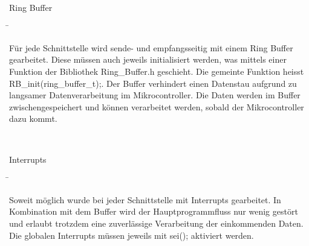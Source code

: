 \begin{tabbing}
{}\\

\parbox[t]{.3\textwidth}{

Ring Buffer

} \=\parbox[t]{.7\textwidth}{


Für jede Schnittstelle wird sende- und empfangsseitig mit einem Ring Buffer gearbeitet. Diese müssen auch jeweils initialisiert werden, was mittels einer Funktion der Bibliothek Ring\_Buffer.h geschieht. Die gemeinte Funktion heisst RB\_init(ring\_buffer\_t);. Der Buffer verhindert einen Datenstau aufgrund zu langsamer Datenverarbeitung im Mikrocontroller. Die Daten werden im Buffer zwischengespeichert und können verarbeitet werden, sobald der Mikrocontroller dazu kommt.\\

}\\

\parbox[t]{.3\textwidth}{

Interrupts

} \=\parbox[t]{.7\textwidth}{

Soweit möglich wurde bei jeder Schnittstelle mit Interrupts gearbeitet. In Kombination mit dem Buffer wird der Hauptprogrammfluss nur wenig gestört und erlaubt trotzdem eine zuverlässige Verarbeitung der einkommenden Daten. Die globalen Interrupts müssen jeweils mit sei(); aktiviert werden.

}

\end{tabbing}

